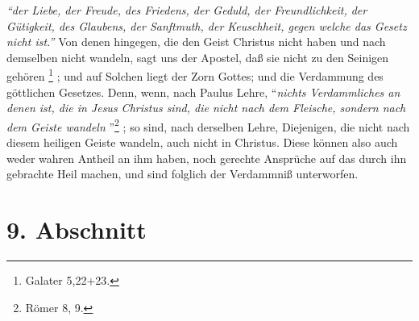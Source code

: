 \textit{"`der Liebe, der Freude, des Friedens, der Geduld, der
Freundlichkeit, der Gütigkeit, des Glaubens, der Sanftmuth, der Keuschheit,
gegen welche das Gesetz nicht ist."'}
Von denen hingegen, die den Geist Christus nicht haben und nach demselben nicht
wandeln, sagt uns der Apostel, daß sie nicht zu den Seinigen
gehören
\footnote{Galater 5,22+23.}
;
und auf Solchen liegt der Zorn Gottes;
und die Verdammung des göttlichen Gesetzes. 
Denn, wenn, nach Paulus Lehre, "`\textit{nichts Verdammliches an denen ist, die
in Jesus Christus sind, die nicht nach dem Fleische, sondern nach dem Geiste
wandeln }"'\footnote{Römer 8, 9.} ;
so sind, nach derselben Lehre, Diejenigen, die nicht nach diesem heiligen Geiste
wandeln, auch nicht in Christus.
Diese können also auch weder wahren Antheil an ihm haben, noch gerechte
Ansprüche auf das durch ihn gebrachte Heil machen, und sind folglich der
Verdammniß unterworfen. 

\section{9. Abschnitt} \label{kap1_ab9}

